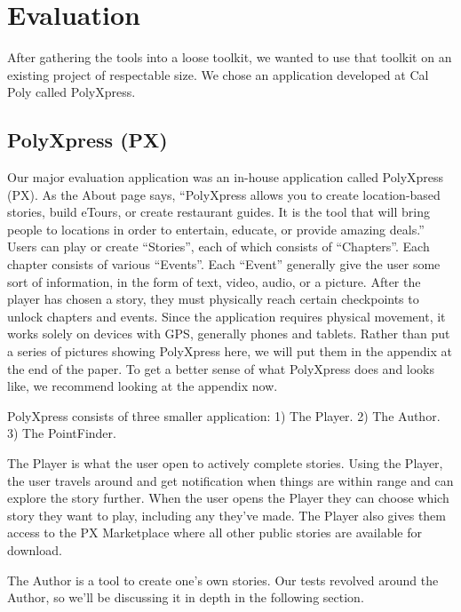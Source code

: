\documentclass[12pt]{ucthesis}
\begin{document}

\chapter{Evaluation}
After gathering the tools into a loose toolkit, we wanted to use that toolkit on an existing project of respectable size. We chose an application developed at Cal Poly called PolyXpress.

\section{PolyXpress (PX)}
Our major evaluation application was an in-house application called PolyXpress (PX)\cite{PX}. As the About page says, ``PolyXpress allows you to create location-based stories, build eTours, or create restaurant guides. It is the tool that will bring people to locations in order to entertain, educate, or provide amazing deals.''\cite{PX} Users can play or create ``Stories'', each of which consists of ``Chapters''. Each chapter consists of various ``Events''. Each ``Event'' generally give the user some sort of information, in the form of text, video, audio, or a picture. After the player has chosen a story, they must physically reach certain checkpoints to unlock chapters and events. Since the application requires physical movement, it works solely on devices with GPS, generally phones and tablets. Rather than put a series of pictures showing PolyXpress here, we will put them in the appendix at the end of the paper. To get a better sense of what PolyXpress does and looks like, we recommend looking at the appendix now.

PolyXpress consists of three smaller application: 1) The Player. 2) The Author. 3) The PointFinder.

The Player is what the user open to actively complete stories. Using the Player, the user travels around and get notification when things are within range and can explore the story further. When the user opens the Player they can choose which story they want to play, including any they've made. The Player also gives them access to the PX Marketplace where all other public stories are available for download.

The Author is a tool to create one's own stories. Our tests revolved around the Author, so we'll be discussing it in depth in the following section.
\end{document}

